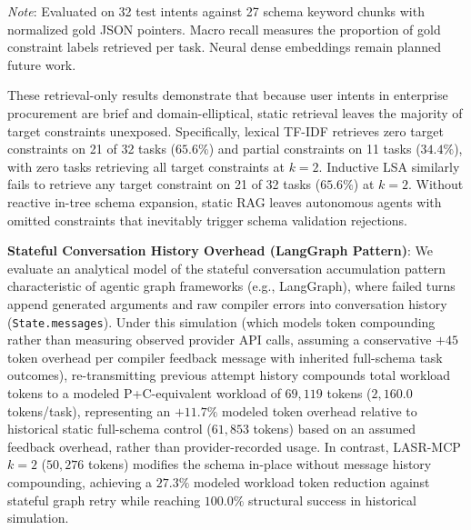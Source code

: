\begin{table}[h]
\centering
\caption{Retrieval-Only Constraint Recall on 32 Benchmark Tasks (Target Catalog: 27 Schema Chunks)}
\label{tab:retrieval_baseline}
\vspace{1mm}
\begin{minipage}{\columnwidth}
\scriptsize
\textit{Note}: Evaluated on 32 test intents against 27 schema keyword chunks with normalized gold JSON pointers. Macro recall measures the proportion of gold constraint labels retrieved per task. Neural dense embeddings remain planned future work.
\end{minipage}
\end{table}

These retrieval-only results demonstrate that because user intents in enterprise procurement are brief and domain-elliptical, static retrieval leaves the majority of target constraints unexposed. Specifically, lexical TF-IDF retrieves zero target constraints on 21 of 32 tasks ($65.6\%$) and partial constraints on 11 tasks ($34.4\%$), with zero tasks retrieving all target constraints at $k=2$. Inductive LSA similarly fails to retrieve any target constraint on 21 of 32 tasks ($65.6\%$) at $k=2$. Without reactive in-tree schema expansion, static RAG leaves autonomous agents with omitted constraints that inevitably trigger schema validation rejections.

\noindent\textbf{Stateful Conversation History Overhead (LangGraph Pattern)}: We evaluate an analytical model of the stateful conversation accumulation pattern characteristic of agentic graph frameworks (e.g., LangGraph), where failed turns append generated arguments and raw compiler errors into conversation history (\texttt{State.messages}). Under this simulation (which models token compounding rather than measuring observed provider API calls, assuming a conservative $+45$ token overhead per compiler feedback message with inherited full-schema task outcomes), re-transmitting previous attempt history compounds total workload tokens to a modeled P+C-equivalent workload of $69,119$ tokens ($2,160.0$ tokens/task), representing an $\mathbf{+11.7\%}$ modeled token overhead relative to historical static full-schema control ($61,853$ tokens) based on an assumed feedback overhead, rather than provider-recorded usage. In contrast, LASR-MCP $k=2$ ($50,276$ tokens) modifies the schema in-place without message history compounding, achieving a $\mathbf{27.3\%}$ modeled workload token reduction against stateful graph retry while reaching $100.0\%$ structural success in historical simulation.

